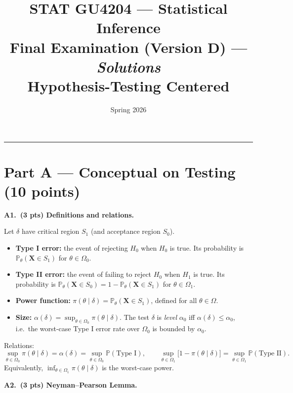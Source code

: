 \documentclass[11pt]{article}
\title{\textbf{STAT GU4204 --- Statistical Inference} \\
       \large Final Examination (Version D) --- \emph{Solutions} \\
       \normalsize Hypothesis-Testing Centered}
\author{Spring 2026}
\date{}
\begin{document}
\maketitle

\hrule

\vspace{0.6em}

\section*{Part A --- Conceptual on Testing (10 points)}

\textbf{A1.\ (3 pts) Definitions and relations.}

Let $\delta$ have critical region $S_1$ (and acceptance region $S_0$).
\begin{itemize}[leftmargin=2em, itemsep=2pt]
    \item[(i)] \textbf{Type I error:} the event of rejecting $H_0$ when $H_0$ is true. Its probability is $\mathbb{P}_\theta(\mathbf{X} \in S_1)$ for $\theta \in \Omega_0$.
    \item[(ii)] \textbf{Type II error:} the event of failing to reject $H_0$ when $H_1$ is true. Its probability is $\mathbb{P}_\theta(\mathbf{X} \in S_0) = 1 - \mathbb{P}_\theta(\mathbf{X} \in S_1)$ for $\theta \in \Omega_1$.
    \item[(iii)] \textbf{Power function:} $\pi(\theta\mid\delta) = \mathbb{P}_\theta(\mathbf{X} \in S_1)$, defined for all $\theta \in \Omega$.
    \item[(iv)] \textbf{Size:} $\alpha(\delta) = \sup_{\theta \in \Omega_0} \pi(\theta\mid\delta)$. The test $\delta$ is \emph{level} $\alpha_0$ iff $\alpha(\delta) \le \alpha_0$, i.e.\ the worst-case Type I error rate over $\Omega_0$ is bounded by $\alpha_0$.
\end{itemize}

Relations:
\[
    \sup_{\theta \in \Omega_0} \pi(\theta \mid \delta) = \alpha(\delta) = \sup_{\theta\in\Omega_0}\mathbb{P}(\text{Type I}),\qquad
    \sup_{\theta \in \Omega_1} \bigl[1 - \pi(\theta \mid \delta)\bigr] = \sup_{\theta\in\Omega_1}\mathbb{P}(\text{Type II}).
\]
Equivalently, $\inf_{\theta \in \Omega_1} \pi(\theta\mid\delta)$ is the worst-case power.

\vspace{0.4em}

\textbf{A2.\ (3 pts) Neyman--Pearson Lemma.}
\end{document}
